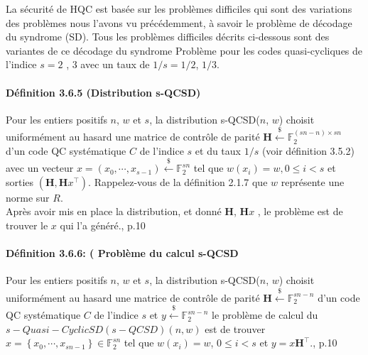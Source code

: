 \documentclass[12pt,openany]{report}
\begin{document}
La sécurité de HQC est basée sur les problèmes difficiles qui sont des variations des problèmes
nous l’avons vu précédemment, à savoir le problème de décodage du syndrome (SD).
Tous les problèmes difficiles décrits ci-dessous sont des variantes de ce décodage du syndrome
Problème pour les codes quasi-cycliques de l’indice $s = 2$ , $3$ avec un taux de $1/s = 1/2$, $1/3$.

\paragraph{Définition 3.6.5 (Distribution s-QCSD) \\}

Pour les entiers positifs $n$, $w$ et
$s$, la distribution s-QCSD($n$, $w$) choisit uniformément au hasard une matrice de contrôle de parité
$ \mathbf{H}\overset{\$}{\gets} \mathbb{F}_2^{(sn-n)\times sn} $
d’un code QC systématique $\mathit{C}$ de l’indice $s$ et du taux $1/s$ (voir définition
3.5.2) avec un vecteur $x = (x_0,\cdots, x_{s-1})\overset{\$}{\gets} \mathbb{F}_2^{sn}$ tel que $w(x_i) = w, 0 \leq i < s$ et sorties $(\mathbf{H}, \mathbf{H}x^{\top})$. Rappelez-vous de la définition 2.1.7 que $w$ représente une norme sur $ \mathit{R}$.\\
Après avoir mis en place la distribution, et donné $\mathbf{H}$, $\mathbf{H}x$
, le problème est de trouver le $x$
qui l’a généré.\cite{melchor2020}, p.10

\paragraph{Définition 3.6.6: ( Problème du calcul s-QCSD \\  }
Pour les entiers positifs $n$, $w$ et
$s$, la distribution s-QCSD($n$, $w$) choisit uniformément au hasard une matrice de contrôle de parité
$ \mathbf{H}\overset{\$}{\gets} \mathbb{F}_2^{sn-n} $
d’un code QC systématique $\mathit{C}$ de l’indice $s$ et $ y \overset{\$}{\gets} \mathbb{F}_2^{sn-n} $ le problème de calcul du $  s-Quasi-Cyclic SD (s-QCSD)(n,w)$ est de trouver $ x=\left\lbrace x_0,\cdots,x_{sn-1}\right\rbrace  \in \mathbb{F}_2^{sn}$ tel que $  w(x_i)=w$, $ 0 \leq i< s$ et $ y=x\mathbf{H}^{\top}$.\cite{melchor2020}, p.10
\end{document}
